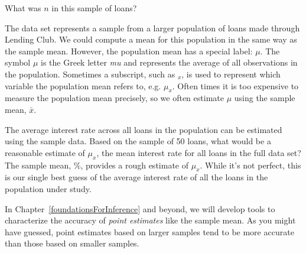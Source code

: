 \begin{exercisewrap}
\begin{nexercise}
What was $n$ in this sample of
loans?\footnotemark{}
\end{nexercise}
\end{exercisewrap}

The  data set represents a sample from
a larger population of loans made through Lending Club.
We could compute a mean for this population in the same way
as the sample mean.
However, the population mean has a special label: $\mu$.
The symbol $\mu$ is the Greek letter \emph{mu} and represents
the average of all observations in the population.
Sometimes a subscript, such as $_x$,
is used to represent which variable the population mean
refers to, e.g. $\mu_x$.
Often times it is too expensive to measure the
population mean precisely, so we often estimate
$\mu$ using the sample mean, $\bar{x}$.

\D{\newpage}

\begin{examplewrap}
\begin{nexample}{The average interest rate across all loans
    in the population can be estimated using the sample data.
    Based on the sample of 50 loans,
    what would be a reasonable estimate of $\mu_x$,
    the mean interest rate for all loans in the
    full data set?}
  The sample mean, \loanAvg{}\%, provides a rough estimate
  of $\mu_x$.
  While it's not perfect, this is our single best guess
  of the average interest rate of all the loans in the
  population under study.

  In Chapter~\ref{foundationsForInference} and beyond,
  we will develop tools to characterize the accuracy
  of \emph{point estimates}
  like the sample mean.
  As you might have guessed,
  point estimates based on larger samples tend to be
  more accurate than those based on smaller samples.
\end{nexample}
\end{examplewrap}


